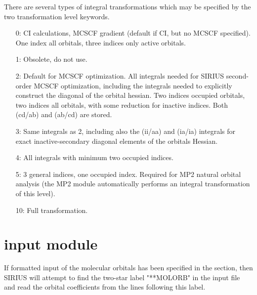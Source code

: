 There are several types of integral transformations which may be
specified by the two transformation level keywords.
\begin{itemize}
   \item[0:] CI calculations, MCSCF gradient (default if CI, but
             no MCSCF specified).
             One index all orbitals, three indices only active
             orbitals.
 
   \item[1:] Obsolete, do not use.
 
   \item[2:] Default for MCSCF optimization. All integrals needed for SIRIUS
             second-order MCSCF optimization, including the integrals
             needed to explicitly construct the diagonal of the orbital
             hessian. Two indices occupied orbitals, two indices all
             orbitals, with some reduction for inactive indices.
             Both (cd/ab) and (ab/cd) are stored.
 
   \item[3:] Same integrals as 2, including also the (ii/aa) and
             (ia/ia) integrals for exact inactive-secondary diagonal elements
             of the orbitals Hessian.
 
   \item[4:] All integrals with minimum two occupied indices.
 
   \item[5:] 3 general indices, one occupied index.  Required for MP2
             natural orbital analysis (the MP2 module automatically
             performs an integral transformation of this level).
 
  \item[10:] Full transformation.
\end{itemize}
 
 
\pagebreak[3]
\section{\label{sec:ref-molorbinp}  input module}
 
If formatted input of the molecular orbitals has been specified in the
 section, then SIRIUS will attempt to find the two-star
label "**MOLORB" in the input file and read the orbital coefficients
from the lines following this label.
 
